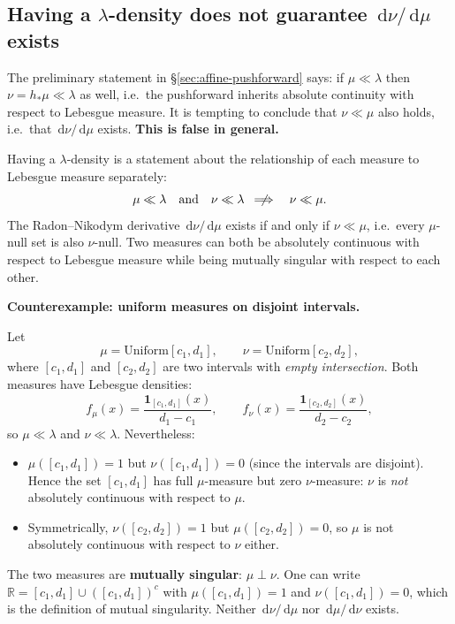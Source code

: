 \documentclass[11pt,a4paper]{article}
\newcommand{\dif}{\,\mathrm{d}}
\newcommand{\R}{\mathbb{R}}
\begin{document}
\subsection{Having a $\lambda$-density does not guarantee $\dif\nu/\dif\mu$ exists}
\label{sec:no-rn}

The preliminary statement in \S\ref{sec:affine-pushforward} says: if $\mu\ll\lambda$ then
$\nu=h_*\mu\ll\lambda$ as well, i.e.\ the pushforward inherits absolute continuity with
respect to Lebesgue measure.
It is tempting to conclude that $\nu\ll\mu$ also holds, i.e.\ that $\dif\nu/\dif\mu$
exists.  \textbf{This is false in general.}

Having a $\lambda$-density is a statement about the relationship of each measure to
Lebesgue measure separately:
\[
  \mu\ll\lambda \quad\text{and}\quad \nu\ll\lambda
  \quad\not\!\!\!\Longrightarrow\quad
  \nu\ll\mu.
\]
The Radon--Nikodym derivative $\dif\nu/\dif\mu$ exists if and only if $\nu\ll\mu$, i.e.\
every $\mu$-null set is also $\nu$-null.  Two measures can both be absolutely continuous
with respect to Lebesgue measure while being mutually singular with respect to each other.

\medskip\noindent\textbf{Counterexample: uniform measures on disjoint intervals.}

Let
\[
  \mu = \mathrm{Uniform}[c_1,d_1],\qquad
  \nu = \mathrm{Uniform}[c_2,d_2],
\]
where $[c_1,d_1]$ and $[c_2,d_2]$ are two intervals with \emph{empty intersection}.
Both measures have Lebesgue densities:
\[
  f_\mu(x) = \frac{\mathbf{1}_{[c_1,d_1]}(x)}{d_1-c_1},\qquad
  f_\nu(x) = \frac{\mathbf{1}_{[c_2,d_2]}(x)}{d_2-c_2},
\]
so $\mu\ll\lambda$ and $\nu\ll\lambda$.  Nevertheless:

\begin{itemize}
  \item $\mu([c_1,d_1])=1$ but $\nu([c_1,d_1])=0$ (since the intervals are disjoint).
        Hence the set $[c_1,d_1]$ has full $\mu$-measure but zero $\nu$-measure:
        $\nu$ is \emph{not} absolutely continuous with respect to $\mu$.
  \item Symmetrically, $\nu([c_2,d_2])=1$ but $\mu([c_2,d_2])=0$, so
        $\mu$ is not absolutely continuous with respect to $\nu$ either.
\end{itemize}

The two measures are \textbf{mutually singular}: $\mu\perp\nu$.
One can write $\R = [c_1,d_1] \cup ([c_1,d_1])^c$ with $\mu([c_1,d_1])=1$ and
$\nu([c_1,d_1])=0$, which is the definition of mutual singularity.
Neither $\dif\nu/\dif\mu$ nor $\dif\mu/\dif\nu$ exists.
\end{document}
